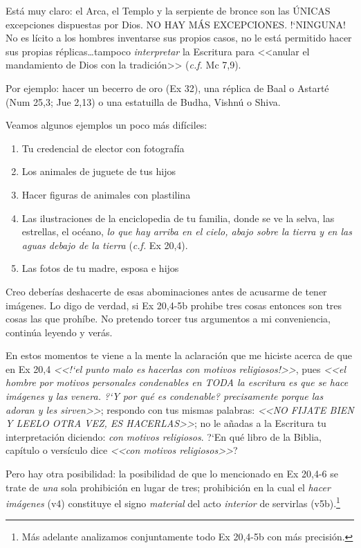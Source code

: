 \documentclass{article}
\begin{document}
\noindent
Est\'a muy claro: el Arca, el Templo y la serpiente de bronce son las \'UNICAS excepciones dispuestas por Dios. NO HAY M\'AS EXCEPCIONES. !`NINGUNA! No es l\'{i}cito a los hombres inventarse sus propios casos, no le est\'a permitido hacer sus propias r\'eplicas\ldots tampoco \emph{interpretar} la Escritura para <<anular el mandamiento de Dios con la tradici\'on>> (\emph{c.f.} Mc 7,9).

Por ejemplo: hacer un becerro de oro (Ex 32), una r\'eplica de Baal o Astart\'e (Num 25,3; Jue 2,13) o una estatuilla de Budha, Vishn\'u o Shiva.

Veamos algunos ejemplos un poco m\'as dif\'{i}ciles:

\begin{enumerate}
\item Tu credencial de elector con fotograf\'{i}a
\item Los animales de juguete de tus hijos
\item Hacer figuras de animales con plastilina
\item Las ilustraciones de la enciclopedia de tu familia, donde se ve la selva, las estrellas, el oc\'eano, \emph{lo que hay arriba en el cielo, abajo sobre la tierra y en las aguas debajo de la tierra} (\emph{c.f.} Ex 20,4).
\item Las fotos de tu madre, esposa e hijos
\end{enumerate}

\noindent
Creo deber\'{i}as deshacerte de esas abominaciones antes de acusarme de tener im\'agenes. Lo digo de verdad, si Ex 20,4-5b prohibe tres cosas entonces son tres cosas las que proh\'{i}be. No pretendo torcer tus argumentos a mi conveniencia, contin\'ua leyendo y ver\'as.

En estos momentos te viene a la mente la aclaraci\'on que me hiciste acerca de que en Ex 20,4 \emph{<<!`el punto malo es hacerlas con motivos religiosos!>>}, pues \emph{<<el hombre por motivos personales condenables en TODA la escritura es que se hace imágenes y las venera. ?`Y por qu\'e es condenable? precisamente porque las adoran y les sirven>>}; respondo con tus mismas palabras: \emph{<<NO FIJATE BIEN Y LEELO OTRA VEZ, ES HACERLAS>>}; no le a\~nadas a la Escritura tu interpretaci\'on diciendo: \emph{con motivos religiosos}. ?`En qu\'e libro de la Biblia, cap\'{i}tulo o vers\'{i}culo dice \emph{<<con motivos religiosos>>}?

Pero hay otra posibilidad: la posibilidad de que lo mencionado en Ex 20,4-6 se trate de \emph{una} sola prohibici\'on en lugar de tres; prohibici\'on en la cual el \emph{hacer im\'agenes} (v4) constituye el signo \emph{material} del acto \emph{interior} de servirlas (v5b).\footnote{M\'as adelante analizamos conjuntamente todo Ex 20,4-5b con m\'as precisi\'on.}
\end{document}
